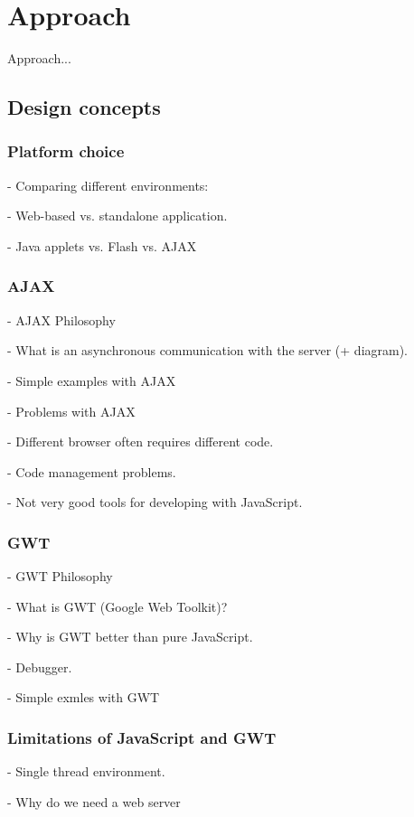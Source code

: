 \chapter{Approach}
\label{chap:approach}

Approach...

\section{Design concepts} 
\label{sec:approach-design}
\subsection{Platform choice}

- Comparing different environments:

- Web-based vs. standalone application. 

- Java applets vs. Flash vs. AJAX

\subsection{AJAX}
\label{sec:ajax}
- AJAX Philosophy

- What is an asynchronous communication with the server (+ diagram).

- Simple examples with AJAX 

- Problems with AJAX 

- Different browser often requires different code.

- Code management problems.

- Not very good tools for developing with JavaScript.

\subsection{GWT} 
\label{sec:gwt}
- GWT Philosophy

- What is GWT (Google Web Toolkit)?

- Why is GWT better than pure JavaScript.

- Debugger.

- Simple exmles with GWT

\subsection{Limitations of JavaScript and GWT}

- Single thread environment.

- Why do we need a web server

